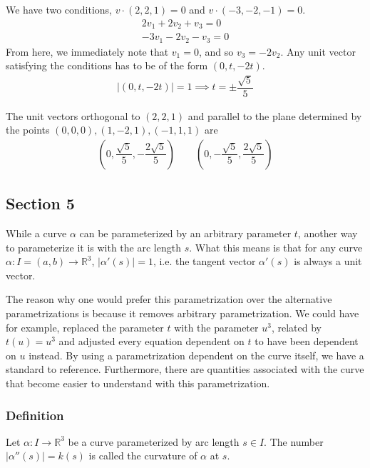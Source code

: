 \documentclass{article}
\newcommand{\R}{\mathbb{R}}
\begin{document}
	We have two conditions, $v \cdot (2, 2, 1) = 0$ and $v \cdot (-3, -2, -1) = 0$.
	\begin{gather*}
		2v_1 + 2v_2 + v_3 = 0 \\
		-3v_1 - 2v_2 - v_3 = 0
	\end{gather*}
	From here, we immediately note that $v_1 = 0$, and so $v_3 = -2v_2$. Any unit vector satisfying the conditions has to be of the form $(0, t, -2t)$.
	\begin{gather*}
		|(0, t, -2t)| = 1 \implies t = \pm \dfrac{\sqrt{5}}{5}
	\end{gather*}
	
	The unit vectors orthogonal to $(2, 2, 1)$ and parallel to the plane determined by the points $(0, 0, 0), (1, -2, 1), (-1, 1, 1)$ are
	\begin{gather*}
		\left( 0, \dfrac{\sqrt{5}}{5}, - \dfrac{2\sqrt{5}}{5} \right) \qquad \left( 0, -\dfrac{\sqrt{5}}{5}, \dfrac{2\sqrt{5}}{5} \right)
	\end{gather*}
	
	
	\subsection*{Section 5}
	While a curve $\alpha$ can be parameterized by an arbitrary parameter $t$, another way to parameterize it is with the arc length $s$. What this means is that for any curve $\alpha \colon I = (a, b) \to \R^3$, $|\alpha'(s)| = 1$, i.e. the tangent vector $\alpha'(s)$ is always a unit vector.
	
	The reason why one would prefer this parametrization over the alternative parametrizations is because it removes arbitrary parametrization. We could have for example, replaced the parameter $t$ with the parameter $u^3$, related by $t(u) = u^3$ and adjusted every equation dependent on $t$ to have been dependent on $u$ instead. By using a parametrization dependent on the curve itself, we have a standard to reference. Furthermore, there are quantities associated with the curve that become easier to understand with this parametrization.
	
	\subsubsection*{Definition}
	Let $\alpha \colon I \to \R^3$ be a curve parameterized by arc length $s \in I$. The number $|\alpha''(s)| = k(s)$ is called the curvature of $\alpha$ at $s$. \\
	
\end{document}
